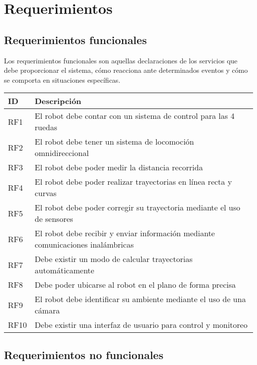 \chapter{Requerimientos}

\section{Requerimientos funcionales}

Los requerimientos funcionales son aquellas declaraciones de los servicios que debe proporcionar el sistema, cómo reacciona ante determinados eventos y cómo se comporta en situaciones específicas.

\begin{center} 
    \begin{tabular} {
        | >{\centering\arraybackslash}m{1cm}
        | >{\centering\arraybackslash}m{13cm}|}
        \hline
            ID & Descripción \\
        \hline
            RF1 & El robot debe contar con un sistema de control para las 4 ruedas \\ 
        \hline
            RF2 & El robot debe tener un sistema de locomoción omnidireccional \\ 
        \hline
            RF3 & El robot debe poder medir la distancia recorrida \\ 
        \hline
            RF4 & El robot debe poder realizar trayectorias en línea recta y curvas \\ 
        \hline
            RF5 & El robot debe poder corregir su trayectoria mediante el uso de sensores \\ 
        \hline
            RF6 & El robot debe recibir y enviar información mediante comunicaciones inalámbricas \\ 
        \hline
            RF7 & Debe existir un modo de calcular trayectorias automáticamente \\
        \hline
            RF8 & Debe poder ubicarse al robot en el plano de forma precisa \\
        \hline
            RF9 & El robot debe identificar su ambiente mediante el uso de una cámara \\ 
        \hline
            RF10 & Debe existir una interfaz de usuario para control y monitoreo \\ 
        \hline
    \end{tabular}
\end{center}

\section{Requerimientos no funcionales}

